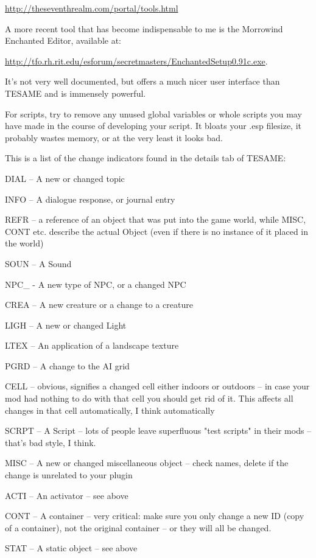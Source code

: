 \url{http://theseventhrealm.com/portal/tools.html}

A more recent tool that has become indispensable to me is the Morrowind
Enchanted Editor, available at:

\url{http://tfo.rh.rit.edu/esforum/secretmasters/EnchantedSetup0.91c.exe}.

It's not very well documented, but offers a much nicer user interface
than TESAME and is immensely powerful.

For scripts, try to remove any unused global variables or whole scripts
you may have made in the course of developing your script. It bloats
your .esp filesize, it probably wastes memory, or at the very least it
looks bad.

This is a list of the change indicators found in the details tab of
TESAME:

DIAL -- A new or changed topic

INFO -- A dialogue response, or journal entry

REFR -- a reference of an object that was put into the game world, while
MISC, CONT etc. describe the actual Object (even if there is no instance
of it placed in the world)

SOUN -- A Sound

NPC\_ - A new type of NPC, or a changed NPC

CREA -- A new creature or a change to a creature

LIGH -- A new or changed Light

LTEX -- An application of a landscape texture

PGRD -- A change to the AI grid

CELL -- obvious, signifies a changed cell either indoors or outdoors --
in case your mod had nothing to do with that cell you should get rid of
it. This affects all changes in that cell automatically, I think
automatically

SCRPT -- A Script -- lots of people leave superfluous "test scripts" in
their mods -- that's bad style, I think.

MISC -- A new or changed miscellaneous object -- check names, delete if
the change is unrelated to your plugin

ACTI -- An activator -- see above

CONT -- A container -- very critical: make sure you only change a new ID
(copy of a container), not the original container -- or they will all be
changed.

STAT -- A static object -- see above

